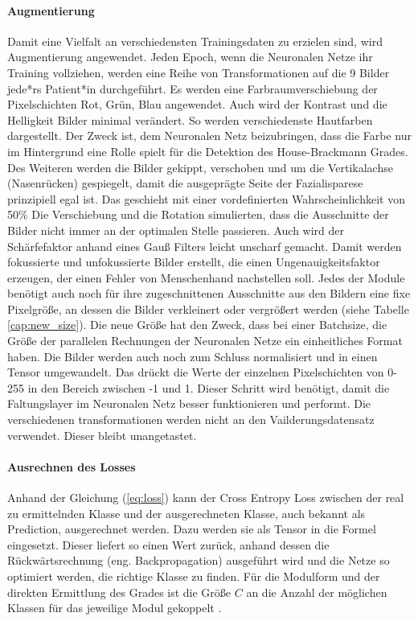 \paragraph{Augmentierung} Damit eine Vielfalt an verschiedensten Trainingsdaten zu erzielen sind, wird Augmentierung angewendet. Jeden Epoch, wenn die Neuronalen Netze ihr Training vollziehen, werden eine Reihe von Transformationen auf die 9 Bilder jede*rs Patient*in durchgeführt. Es werden eine Farbraumverschiebung der Pixelschichten Rot, Grün, Blau angewendet. Auch wird der Kontrast und die Helligkeit Bilder minimal verändert. So werden verschiedenste Hautfarben dargestellt. Der Zweck ist, dem Neuronalen Netz beizubringen, dass die Farbe nur im Hintergrund eine Rolle spielt für die Detektion des House-Brackmann Grades. Des Weiteren werden die Bilder gekippt, verschoben und um die Vertikalachse (Nasenrücken) gespiegelt, damit die ausgeprägte Seite der Fazialisparese prinzipiell egal ist. Das geschieht mit einer vordefinierten Wahrscheinlichkeit von 50\% Die Verschiebung und die Rotation simulierten, dass die Ausschnitte der Bilder nicht immer an der optimalen Stelle passieren. Auch wird der Schärfefaktor anhand eines Gauß Filters leicht unscharf gemacht. Damit werden fokussierte und unfokussierte Bilder erstellt, die einen Ungenauigkeitsfaktor erzeugen, der einen Fehler von Menschenhand nachstellen soll. Jedes der Module benötigt auch noch für ihre zugeschnittenen Ausschnitte aus den Bildern eine fixe Pixelgröße, an dessen die Bilder verkleinert oder vergrößert werden (siehe Tabelle \ref{cap:new_size}). Die neue Größe hat den Zweck, dass bei einer Batchsize, die Größe der parallelen Rechnungen der Neuronalen Netze ein einheitliches Format haben. Die Bilder werden auch noch zum Schluss normalisiert und in einen Tensor umgewandelt. Das drückt die Werte der einzelnen Pixelschichten von 0-255 in den Bereich zwischen -1 und 1. Dieser Schritt wird benötigt, damit die Faltungslayer im Neuronalen Netz besser funktionieren und performt. Die verschiedenen transformationen werden nicht an den Vailderungsdatensatz verwendet. Dieser bleibt unangetastet.

\clearpage
\paragraph{Ausrechnen des Losses} Anhand der Gleichung (\ref{eq:loss}) kann der Cross Entropy Loss zwischen der real zu ermittelnden Klasse und der ausgerechneten Klasse, auch bekannt als Prediction, ausgerechnet werden. Dazu werden sie als Tensor in die Formel eingesetzt. Dieser liefert so einen Wert zurück, anhand dessen die Rückwärtsrechnung (eng. Backpropagation) ausgeführt wird und die Netze so optimiert werden, die richtige Klasse zu finden. Für die Modulform und der direkten Ermittlung des Grades ist die Größe $C$ an die Anzahl der möglichen Klassen für das jeweilige Modul gekoppelt \cite{pytorch}.

